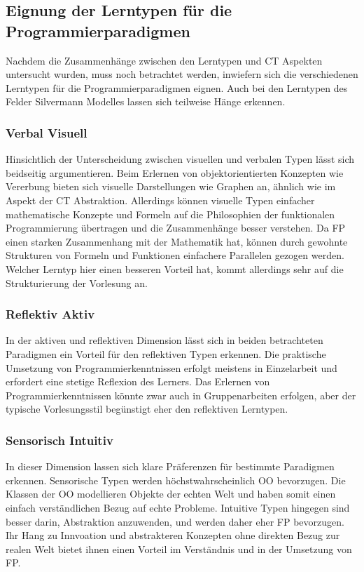 \subsection{Eignung der Lerntypen für die Programmierparadigmen}
Nachdem die Zusammenhänge zwischen den Lerntypen und CT Aspekten untersucht wurden, muss noch betrachtet werden, inwiefern sich die verschiedenen Lerntypen für die Programmierparadigmen eignen.
Auch bei den Lerntypen des Felder Silvermann Modelles lassen sich teilweise Hänge erkennen.

\subsubsection{Verbal Visuell}
Hinsichtlich der Unterscheidung zwischen visuellen und verbalen Typen lässt sich beidseitig argumentieren. Beim Erlernen von objektorientierten Konzepten wie Vererbung bieten sich visuelle Darstellungen wie Graphen an, ähnlich wie im Aspekt der CT Abstraktion.
Allerdings können visuelle Typen einfacher mathematische Konzepte und Formeln auf die Philosophien der funktionalen Programmierung übertragen und die Zusammenhänge besser verstehen. Da FP einen starken Zusammenhang mit der Mathematik hat, können durch gewohnte Strukturen von Formeln und Funktionen einfachere Parallelen gezogen werden.
Welcher Lerntyp hier einen besseren Vorteil hat, kommt allerdings sehr auf die Strukturierung der Vorlesung an.

\subsubsection{Reflektiv Aktiv}
In der aktiven und reflektiven Dimension lässt sich in beiden betrachteten Paradigmen ein Vorteil für den reflektiven Typen erkennen. Die praktische Umsetzung von Programmierkenntnissen erfolgt meistens in Einzelarbeit und erfordert eine stetige Reflexion des Lerners.
Das Erlernen von Programmierkenntnissen könnte zwar auch in Gruppenarbeiten erfolgen, aber der typische Vorlesungsstil begünstigt eher den reflektiven Lerntypen.

\subsubsection{Sensorisch Intuitiv}
In dieser Dimension lassen sich klare Präferenzen für bestimmte Paradigmen erkennen. Sensorische Typen werden höchstwahrscheinlich OO bevorzugen. Die Klassen der OO modellieren Objekte der echten Welt und haben somit einen einfach verständlichen Bezug auf echte Probleme.
Intuitive Typen hingegen sind besser darin, Abstraktion anzuwenden, und werden daher eher FP bevorzugen.
Ihr Hang zu Innvoation und abstrakteren Konzepten ohne direkten Bezug zur realen Welt bietet ihnen einen Vorteil im Verständnis und in der Umsetzung von FP.

